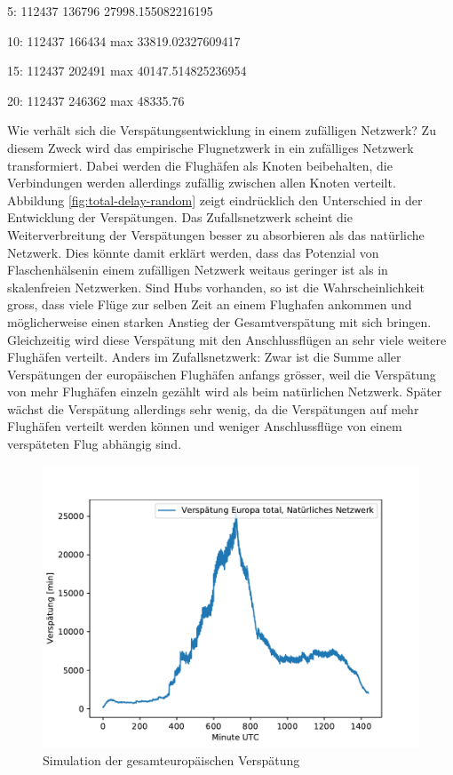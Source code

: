 5:
112437
136796
27998.155082216195

10:
112437
166434
max 33819.02327609417

15:
112437
202491
max 40147.514825236954


20:
112437
246362
max 48335.76


Wie verhält sich die Verspätungsentwicklung in einem zufälligen Netzwerk?
Zu diesem Zweck wird das empirische Flugnetzwerk in ein zufälliges Netzwerk transformiert.
Dabei werden die Flughäfen als Knoten beibehalten, die Verbindungen werden allerdings zufällig zwischen allen
Knoten verteilt.
Abbildung \ref{fig:total-delay-random} zeigt eindrücklich den Unterschied in der Entwicklung der Verspätungen.
Das Zufallsnetzwerk scheint die Weiterverbreitung der Verspätungen besser zu absorbieren als das natürliche Netzwerk.
Dies könnte damit erklärt werden, dass das Potenzial von \guillemotleft Flaschenhälsen\guillemotright in einem
zufälligen Netzwerk weitaus geringer ist als in skalenfreien Netzwerken.
Sind Hubs vorhanden, so ist die Wahrscheinlichkeit gross, dass viele Flüge zur selben Zeit an einem Flughafen ankommen
und möglicherweise einen starken Anstieg der Gesamtverspätung mit sich bringen.
Gleichzeitig wird diese Verspätung mit den Anschlussflügen an sehr viele weitere Flughäfen verteilt.
Anders im Zufallsnetzwerk: Zwar ist die Summe aller Verspätungen der europäischen Flughäfen anfangs grösser, weil
die Verspätung von mehr Flughäfen einzeln gezählt wird als beim natürlichen Netzwerk.
Später wächst die Verspätung allerdings sehr wenig, da die Verspätungen auf mehr Flughäfen verteilt werden können und
weniger Anschlussflüge von einem verspäteten Flug abhängig sind.

\begin{figure}
    \centering
    \includegraphics[width=0.75\linewidth]{images/total-delay-first-simulation-run.pdf}
    \caption{Simulation der gesamteuropäischen Verspätung}
    \label{fig:first-simulation-run}
\end{figure}

